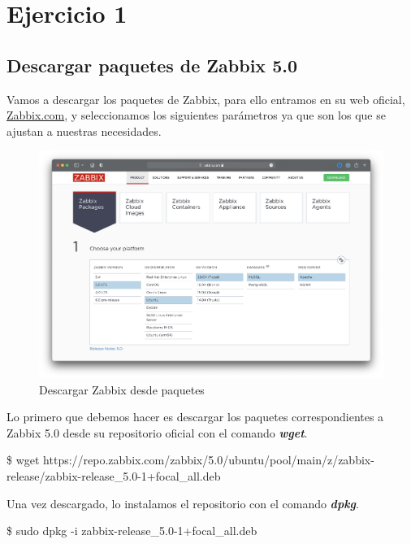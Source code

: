 \section{Ejercicio 1}
\subsection{Descargar paquetes de Zabbix 5.0}

    Vamos a descargar los paquetes de Zabbix, para ello entramos en su web oficial, \href{https://www.zabbix.com/download}{Zabbix.com}, y 
    seleccionamos los siguientes parámetros ya que son los que se ajustan a nuestras necesidades.
        
    \begin{figure}[H]
        \centering
        \includegraphics[scale=0.3]{images/zabbix_official.png}
        \caption{Descargar Zabbix desde paquetes}
        \label{fig:zabbix_official}
    \end{figure}

    Lo primero que debemos hacer es descargar los paquetes correspondientes a Zabbix 5.0 desde su repositorio oficial con el comando \textbf{\emph{wget}}. 
        \begin{tcolorbox}[colback=black!10, halign=left]
            \$ wget https://repo.zabbix.com/zabbix/5.0/ubuntu/pool/main/z/zabbix-release/zabbix-release\_5.0-1+focal\_all.deb
        \end{tcolorbox}

    Una vez descargado, lo instalamos el repositorio con el comando \textbf{\emph{dpkg}}.
        \begin{tcolorbox}[colback=black!10, halign=left]
            \$ sudo dpkg -i zabbix-release\_5.0-1+focal\_all.deb
        \end{tcolorbox}

